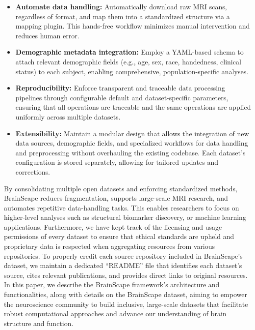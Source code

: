 \begin{itemize}
    
    \item \textbf{Automate data handling:} 
    Automatically download raw MRI scans, regardless of format, and map them into a standardized structure via a mapping plugin. 
    This hands-free workflow minimizes manual intervention and reduces human error.

    \item \textbf{Demographic metadata integration:}
    Employ a YAML-based schema to attach relevant demographic fields (e.g., age, sex, race, handedness, clinical status) to each subject, 
    enabling comprehensive, population-specific analyses.

    \item \textbf{Reproducibility:}
    Enforce transparent and traceable data processing pipelines through configurable default and dataset-specific parameters, ensuring 
    that all operations are traceable and the same operations are applied uniformly across multiple datasets.

    \item \textbf{Extensibility:}
    Maintain a modular design that allows the integration of new data sources, demographic fields, and specialized workflows for data handling and preprocessing 
    without overhauling the existing codebase. 
    Each dataset's configuration is stored separately, allowing for tailored updates and corrections.

\end{itemize}


By consolidating multiple open datasets and enforcing standardized methods, BrainScape reduces fragmentation, 
supports large-scale MRI research, and automates repetitive data-handling tasks. 
This enables researchers to focus on higher-level analyses such as structural biomarker discovery, 
or machine learning applications.
Furthermore, we have kept track of the licensing and usage permissions of every dataset to ensure that ethical 
standards are upheld and proprietary data is respected when aggregating resources from various repositories.
To properly credit each source repository included in BrainScape's dataset, we maintain a dedicated ``README'' file 
that identifies each dataset's source, cites relevant publications, and provides direct links to original resources.
In this paper, we describe the BrainScape framework's architecture and functionalities, 
along with details on the BrainScape dataset, 
aiming to empower the neuroscience community to build inclusive, 
large-scale datasets that facilitate robust computational approaches 
and advance our understanding of brain structure and function.
